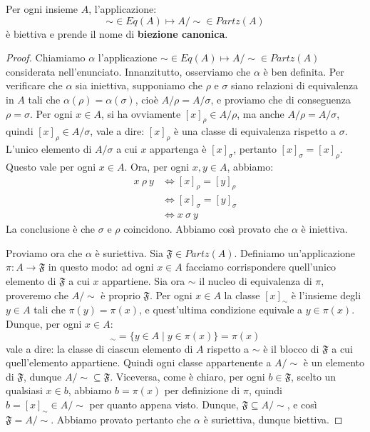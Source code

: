 \begin{teorbox}\label{thm:equivalenza_partizione}
	Per ogni insieme $A$, l'applicazione:
	\begin{displaymath}
		\sim \in Eq(A) \mapsto A/{\sim} \in Partz(A)
	\end{displaymath}
	è biettiva e prende il nome di \textbf{biezione canonica}.
\end{teorbox}


\begin{proof}
	Chiamiamo $\alpha$ l'applicazione $\sim \in Eq(A) \mapsto A / \sim \in Partz(A)$ considerata nell'enunciato. Innanzitutto, osserviamo che $\alpha$ è ben definita. Per verificare che $\alpha$ sia iniettiva, supponiamo che $\rho$ e $\sigma$ siano relazioni di equivalenza in $A$ tali che $\alpha(\rho)=\alpha(\sigma)$, cioè $A / \rho = A / \sigma$, e proviamo che di conseguenza $\rho  = \sigma$. Per ogni $x \in A$, si ha ovviamente $[x]_{\rho} \in A / \rho$, ma anche $A / \rho = A / \sigma$, quindi $[x]_{\rho} \in A / \sigma$, vale a dire: $[x]_{\rho}$ è una classe di equivalenza rispetto a $\sigma$. L'unico elemento di $A / \sigma$ a cui $x$ appartenga è $[x]_{\sigma}$, pertanto $[x]_{\sigma}=[x]_{\rho}$. Questo vale per ogni $x \in A$. Ora, per ogni $x,y \in A$, abbiamo:
	\begin{align*}
		x \ \rho \ y & \iff [x]_{\rho} = [y]_{\rho}     \\
		& \iff [x]_{\sigma} = [y]_{\sigma} \\
		& \iff x \ \sigma \ y
	\end{align*}
	La conclusione è che $\sigma$ e $\rho$ coincidono. Abbiamo così provato che $\alpha$ è iniettiva.
	
	Proviamo ora che $\alpha$ è suriettiva. Sia $\mathfrak{F} \in Partz(A)$. Definiamo un'applicazione $\pi: A \rightarrow \mathfrak{F}$ in questo modo: ad ogni $x \in A$ facciamo corrispondere quell'unico elemento di $\mathfrak{F}$ a cui $x$ appartiene. Sia ora $\sim$ il nucleo di equivalenza di $\pi$, proveremo che $A / \sim$ è proprio $\mathfrak{F}$. Per ogni $x \in A$ la classe $[x]_{\sim}$ è l'insieme degli $y \in A$ tali che $\pi(y)=\pi(x)$, e quest'ultima condizione equivale a $y \in \pi(x)$. Dunque, per ogni $x \in A$:
	\begin{displaymath}
		[x]_{\sim} = \{y \in A \; | \; y \in \pi(x) \} = \pi(x)
	\end{displaymath}
	vale a dire: la classe di ciascun elemento di $A$ rispetto a $\sim$ è il blocco di $\mathfrak{F}$ a cui quell'elemento appartiene. Quindi ogni classe appartenente a $A / {\sim}$ è un elemento di $\mathfrak{F}$, dunque $A / \sim \subseteq \mathfrak{F}$. Viceversa, come è chiaro, per ogni $b \in \mathfrak{F}$, scelto un qualsiasi $x \in b$, abbiamo $b = \pi(x)$ per definizione di $\pi$, quindi $b = [x]_{\sim} \in A / \sim$ per quanto appena visto. Dunque, $\mathfrak{F} \subseteq A/ \sim$, e così $\mathfrak{F} = A / \sim$. Abbiamo provato pertanto che $\alpha$ è suriettiva, dunque biettiva.
\end{proof}


